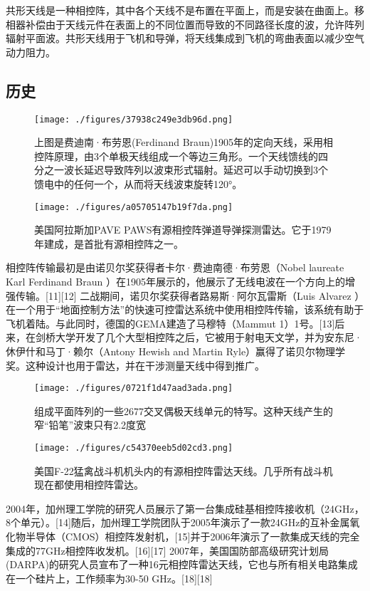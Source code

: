 共形天线是一种相控阵，其中各个天线不是布置在平面上，而是安装在曲面上。移相器补偿由于天线元件在表面上的不同位置而导致的不同路径长度的波，允许阵列辐射平面波。共形天线用于飞机和导弹，将天线集成到飞机的弯曲表面以减少空气动力阻力。

\subsection{历史}
\begin{figure}[ht]
\centering
\texttt{[image: ./figures/37938c249e3db96d.png]}
\caption{上图是费迪南·布劳恩(Ferdinand Braun)1905年的定向天线，采用相控阵原理，由3个单极天线组成一个等边三角形。一个天线馈线的四分之一波长延迟导致阵列以波束形式辐射。延迟可以手动切换到3个馈电中的任何一个，从而将天线波束旋转120°。} \label{fig_XKZ_2}
\end{figure}
\begin{figure}[ht]
\centering
\texttt{[image: ./figures/a05705147b19f7da.png]}
\caption{美国阿拉斯加PAVE PAWS有源相控阵弹道导弹探测雷达。它于1979年建成，是首批有源相控阵之一。} \label{fig_XKZ_3}
\end{figure}
相控阵传输最初是由诺贝尔奖获得者卡尔·费迪南德·布劳恩（Nobel laureate Karl Ferdinand Braun ）在1905年展示的，他展示了无线电波在一个方向上的增强传输。[11][12] 二战期间，诺贝尔奖获得者路易斯·阿尔瓦雷斯（Luis Alvarez ）在一个用于“地面控制方法”的快速可控雷达系统中使用相控阵传输，该系统有助于飞机着陆。与此同时，德国的GEMA建造了马穆特（Mammut 1）1号。[13]后来，在剑桥大学开发了几个大型相控阵之后，它被用于射电天文学，并为安东尼·休伊什和马丁·赖尔（Antony Hewish and Martin Ryle）赢得了诺贝尔物理学奖。这种设计也用于雷达，并在干涉测量天线中得到推广。
\begin{figure}[ht]
\centering
\texttt{[image: ./figures/0721f1d47aad3ada.png]}
\caption{组成平面阵列的一些2677交叉偶极天线单元的特写。这种天线产生的窄“铅笔”波束只有2.2度宽} \label{fig_XKZ_4}
\end{figure}
\begin{figure}[ht]
\centering
\texttt{[image: ./figures/c54370eeb5d02cd3.png]}
\caption{美国F-22猛禽战斗机机头内的有源相控阵雷达天线。几乎所有战斗机现在都使用相控阵雷达。} \label{fig_XKZ_5}
\end{figure}
2004年，加州理工学院的研究人员展示了第一台集成硅基相控阵接收机（24GHz，8个单元）。[14]随后，加州理工学院团队于2005年演示了一款24GHz的互补金属氧化物半导体（CMOS）相控阵发射机，[15]并于2006年演示了一款集成天线的完全集成的77GHz相控阵收发机。[16][17] 2007年，美国国防部高级研究计划局(DARPA)的研究人员宣布了一种16元相控阵雷达天线，它也与所有相关电路集成在一个硅片上，工作频率为30-50 GHz。[18][18]
